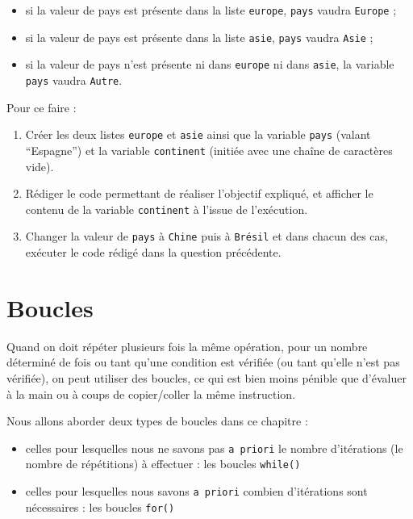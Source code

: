 \documentclass[12pt,]{book}
\providecommand{\tightlist}{%
  \setlength{\itemsep}{0pt}\setlength{\parskip}{0pt}}
\numberwithin{equation}{section}
\numberwithin{countremarque}{section}
\begin{document}
\begin{itemize}
\tightlist
\item
  si la valeur de pays est présente dans la liste \texttt{europe},
  \texttt{pays} vaudra \texttt{Europe} ;
\item
  si la valeur de pays est présente dans la liste \texttt{asie},
  \texttt{pays} vaudra \texttt{Asie} ;
\item
  si la valeur de pays n'est présente ni dans \texttt{europe} ni dans
  \texttt{asie}, la variable \texttt{pays} vaudra \texttt{Autre}.
\end{itemize}

Pour ce faire :

\begin{enumerate}
\def\labelenumi{\arabic{enumi}.}
\tightlist
\item
  Créer les deux listes \texttt{europe} et \texttt{asie} ainsi que la
  variable \texttt{pays} (valant ``Espagne'') et la variable
  \texttt{continent} (initiée avec une chaîne de caractères vide).
\item
  Rédiger le code permettant de réaliser l'objectif expliqué, et
  afficher le contenu de la variable \texttt{continent} à l'issue de
  l'exécution.
\item
  Changer la valeur de \texttt{pays} à \texttt{Chine} puis à
  \texttt{Brésil} et dans chacun des cas, exécuter le code rédigé dans
  la question précédente.
\end{enumerate}

\chapter{Boucles}\label{boucles}

Quand on doit répéter plusieurs fois la même opération, pour un nombre
déterminé de fois ou tant qu'une condition est vérifiée (ou tant qu'elle
n'est pas vérifiée), on peut utiliser des boucles, ce qui est bien moins
pénible que d'évaluer à la main ou à coups de copier/coller la même
instruction.

Nous allons aborder deux types de boucles dans ce chapitre :

\begin{itemize}
\tightlist
\item
  celles pour lesquelles nous ne savons pas \texttt{a\ priori} le nombre
  d'itérations (le nombre de répétitions) à effectuer : les boucles
  \texttt{while()}
\item
  celles pour lesquelles nous savons \texttt{a\ priori} combien
  d'itérations sont nécessaires : les boucles \texttt{for()}
\end{itemize}
\end{document}
